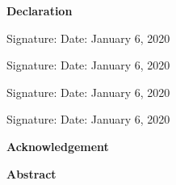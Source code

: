 \documentclass[12pt,a4paper]{report}
\begin{document}
\begin{center}
\textbf{\Large{Declaration}}\thispagestyle{empty}
\end{center}
\vspace{0.7cm}
\par
\vspace{0.5cm}

\noindent
Signature:
\vspace{0.3cm}
\newline
\noindent
Date: January 6, 2020
\vspace{2cm}

\vspace{0.5cm}

\noindent
Signature:
\vspace{0.3cm}
\newline
\noindent
Date: January 6, 2020
\vspace{2cm}

\vspace{0.5cm}

\noindent
Signature:
\vspace{0.3cm}
\newline
\noindent
Date: January 6, 2020
\vspace{2cm}

\vspace{0.5cm}

\noindent
Signature:
\vspace{0.3cm}
\newline
\noindent
Date: January 6, 2020
\clearpage

\thispagestyle{empty}
\begin{center}
\textbf{\Large{Acknowledgement}}
\end{center}
\vspace{0.7cm}
\par
\clearpage

\thispagestyle{empty}
\begin{center}
\textbf{\Large{Abstract}}\thispagestyle{empty}
\end{center}
\vspace{0.7cm}
\par
\newpage

\tableofcontents
{}
\clearpage

\listoffigures
{}
\end{document}
